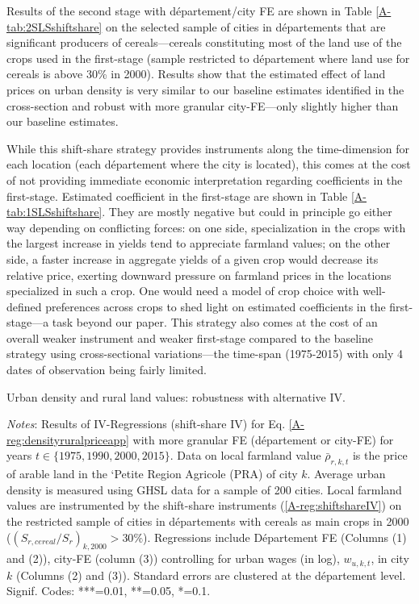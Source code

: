 \documentclass[11pt]{report}
\newcommand{\datatables}{../../output/data/tables}
\begin{document}
Results of the second stage with département/city FE are shown in Table \ref{A-tab:2SLSshiftshare} on the selected sample of cities in départements that are significant producers of cereals---cereals constituting most of the land use of the crops used in the first-stage (sample restricted to département where land use for cereals is above 30\% in 2000). Results show that the estimated effect of land prices on urban density is very similar to our baseline estimates identified in the cross-section and robust with more granular city-FE---only slightly higher than our baseline estimates.



While this shift-share strategy provides instruments along the time-dimension for each location (each département where the city is located), this comes at the cost of not providing immediate economic interpretation regarding coefficients in the first-stage. Estimated coefficient in the first-stage are shown in Table \ref{A-tab:1SLSshiftshare}. They are mostly negative but could in principle go either way depending on conflicting forces: on one side, specialization in the crops with the largest increase in yields tend to appreciate farmland values; on the other side, a faster increase in aggregate yields of a given crop would decrease its relative price, exerting downward pressure on farmland prices in the locations specialized in such a crop. One would need a model of crop choice with well-defined preferences across crops to shed light on estimated coefficients in the first-stage---a task beyond our paper. This strategy also comes at the cost of an overall weaker instrument and weaker first-stage compared to the baseline strategy using cross-sectional variations---the time-span (1975-2015) with only 4 dates of observation being fairly limited.



\begin{table}[h!]
	\begin{center}
		
		\caption{Urban density and rural land values: robustness with alternative IV.\label{A-tab:2SLSshiftshare}}
	\end{center}
	{\footnotesize \textit{Notes}: Results of IV-Regressions (shift-share IV) for Eq. \ref{A-reg:densityruralpriceapp} with more granular FE (département or city-FE) for years $t \in \{1975, 1990, 2000, 2015\}$. Data on local farmland value $\bar{\rho}_{r,k,t}$ is the price of arable land in the `Petite Region Agricole (PRA) of city $k$.  Average urban density is measured using GHSL data for a sample of 200 cities. Local farmland values are instrumented by the shift-share instruments (\ref{A-reg:shiftshareIV}) on the restricted sample of cities in départements with cereals as main crops in 2000 ($(S_{r,cereal}/S_r)_{k,2000}>30\%$). Regressions include Département FE (Columns (1) and (2)), city-FE (column (3))  controlling for urban wages (in log), $w_{u,k,t}$, in city $k$ (Columns (2) and (3)). Standard errors are clustered at the département level. Signif. Codes: ***=0.01, **=0.05, *=0.1.}
\end{table}
\end{document}

